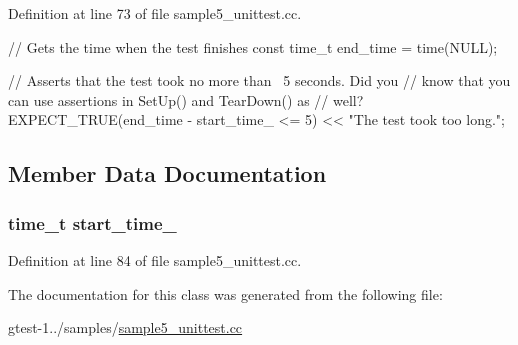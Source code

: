 \-Definition at line 73 of file sample5\-\_\-unittest.\-cc.


\begin{DoxyCode}
                          {
    // Gets the time when the test finishes
    const time_t end_time = time(NULL);

    // Asserts that the test took no more than ~5 seconds.  Did you
    // know that you can use assertions in SetUp() and TearDown() as
    // well?
    EXPECT_TRUE(end_time - start_time_ <= 5) << "The test took too long.";
  }
\end{DoxyCode}


\subsection{\-Member \-Data \-Documentation}
\hypertarget{classQuickTest_a146511d2ae2f8b5c118eb262868e9b68}{
\subsubsection[{start\-\_\-time\-\_\-}]{\setlength{\rightskip}{0pt plus 5cm}time\-\_\-t {\bf start\-\_\-time\-\_\-}}}\label{dd/df0/classQuickTest_a146511d2ae2f8b5c118eb262868e9b68}


\-Definition at line 84 of file sample5\-\_\-unittest.\-cc.



\-The documentation for this class was generated from the following file\-:\begin{DoxyCompactItemize}
\item 
gtest-\/1../samples/\hyperlink{sample5__unittest_8cc}{sample5\-\_\-unittest.\-cc}\end{DoxyCompactItemize}
